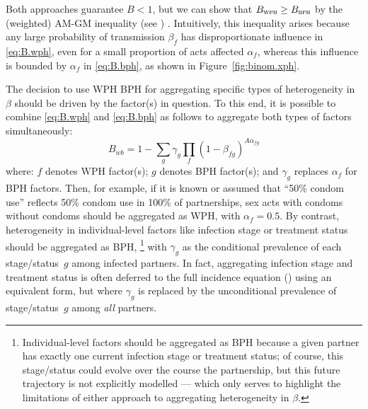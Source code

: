 Both approaches guarantee $B < 1$,
but we can show that $B_{\textsc{wph}} \ge B_{\textsc{bph}}$
by the (weighted) AM-GM inequality (see ) \cite{Aldaz2009}.
Intuitively, this inequality arises because
any large probability of transmission $\beta_f$
has disproportionate influence in \eqref{eq:B.wph},
even for a small proportion of acts affected $\alpha_f$,
whereas this influence is bounded by $\alpha_f$ in \eqref{eq:B.bph},
as shown in Figure~\ref{fig:binom.xph}.
\par
The decision to use WPH \vs BPH for aggregating specific types of heterogeneity in $\beta$
should be driven by the factor(s) in question.
To this end, it is possible to combine \eqref{eq:B.wph} and \eqref{eq:B.bph} as follows
to aggregate both types of factors simultaneously:
\begin{equation}\label{eq:B.xph}
  B_{wb} = 1 - \sum_g \gamma_g \prod_f {(1 - \beta_{fg})}^{A\alpha_{fg}}
\end{equation}
where:
$f$ denotes WPH factor(s);
$g$ denotes BPH factor(s); and
$\gamma_g$ replaces $\alpha_f$ for BPH factors.
Then, for example, if it is known or assumed that
``50\% condom use'' reflects 50\% condom use in 100\% of partnerships,
sex acts with condoms \vs without condoms
should be aggregated as WPH, with $\alpha_f = 0.5$.
By contrast, heterogeneity in individual-level factors like infection stage or treatment status
should be aggregated as BPH,%
\footnote{Individual-level factors should be aggregated as BPH because
  a given partner has exactly one current infection stage or treatment status;
  of course, this stage/status could evolve over the course the partnership,
  but this future trajectory is not explicitly modelled
  --- which only serves to highlight the limitations of
  either approach to aggregating heterogeneity in $\beta$.}
with $\gamma_g$ as the conditional prevalence of each stage/status~$g$ among infected partners.
In fact, aggregating infection stage and treatment status
is often deferred to the full incidence equation () using an equivalent form,
but where $\gamma_g$ is replaced by
the unconditional prevalence of stage/status~$g$ among \emph{all} partners.
